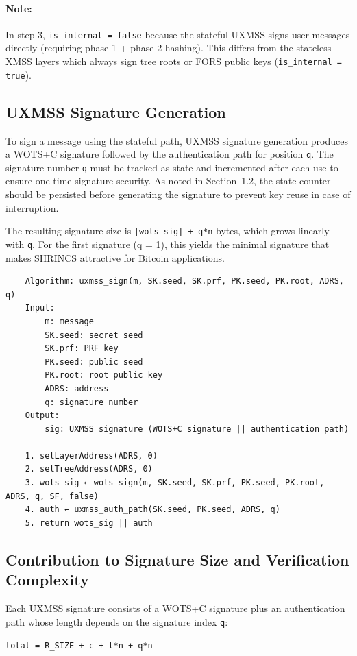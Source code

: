\paragraph{Note:} In step 3, \texttt{is\_internal = false} because the stateful UXMSS signs user messages directly (requiring phase 1 + phase 2 hashing). This differs from the stateless XMSS layers which always sign tree roots or FORS public keys (\texttt{is\_internal = true}).

\subsection{UXMSS Signature Generation}
To sign a message using the stateful path, UXMSS signature generation produces a WOTS+C signature followed by the authentication path for position \texttt{q}. The signature number \texttt{q} must be tracked as state and incremented after each use to ensure one-time signature security. As noted in Section~1.2, the state counter should be persisted before generating the signature to prevent key reuse in case of interruption.

The resulting signature size is \texttt{|wots\_sig| + q*n} bytes, which grows linearly with \texttt{q}. For the first signature (q = 1), this yields the minimal signature that makes SHRINCS attractive for Bitcoin applications.
\begin{verbatim}
    Algorithm: uxmss_sign(m, SK.seed, SK.prf, PK.seed, PK.root, ADRS, q)
    Input:
        m: message
        SK.seed: secret seed
        SK.prf: PRF key
        PK.seed: public seed
        PK.root: root public key
        ADRS: address
        q: signature number 
    Output:
        sig: UXMSS signature (WOTS+C signature || authentication path)

    1. setLayerAddress(ADRS, 0)
    2. setTreeAddress(ADRS, 0)
    3. wots_sig ← wots_sign(m, SK.seed, SK.prf, PK.seed, PK.root, ADRS, q, SF, false)
    4. auth ← uxmss_auth_path(SK.seed, PK.seed, ADRS, q)
    5. return wots_sig || auth
\end{verbatim}

\subsection{Contribution to Signature Size and Verification Complexity}
Each UXMSS signature consists of a WOTS+C signature plus an authentication path whose length depends on the signature index \texttt{q}:
\begin{center}
    \texttt{total = R\_SIZE + c + l*n + q*n}
\end{center}

